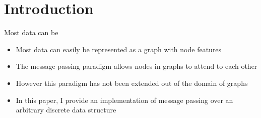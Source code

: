 \section{Introduction}

Most data can be 

\begin{itemize}

    \item Most data can easily be represented as a graph with node features

    \item The message passing paradigm allows nodes in graphs to attend to each other

    \item However this paradigm has not been extended out of the domain of graphs

    \item In this paper, I provide an implementation of message passing over an arbitrary discrete data structure

\end{itemize}
